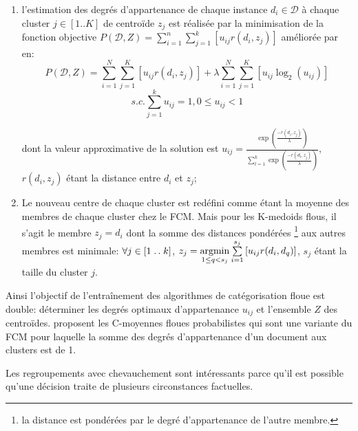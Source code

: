 \begin{enumerate}
 \item l'estimation des degrés d'appartenance de chaque instance $d_i \in \mathcal{D}$ à chaque cluster $j \in [1..K]$ de centroïde $z_j$ est réalisée par la minimisation de la fonction objective $P(\mathcal{D},Z) = \sum\limits_{i=1}^{n}\sum\limits_{j=1}^{k} \left[u_{ij}r(d_i,z_j)\right]$ \citep{krishnapuram2001fuzzycmedoids}  améliorée par \citet{sabzi2011fuzzykmedoids} en:
 \[P(\mathcal{D},Z) = \sum\limits_{i=1}^{N}\sum\limits_{j=1}^{K} \left[u_{ij}r(d_i,z_j)\right] + \lambda \sum\limits_{i=1}^{N}\sum\limits_{j=1}^{K} \left[ u_{ij}\log_2(u_{ij}) \right] \]
 \[s.c. \sum\limits_{j=1}^{k} u_{ij} = 1, 0 \leq u_{ij} < 1\]
 
 dont la valeur approximative de la solution est $u_{ij} = \frac{\exp\left(\frac{-r(d_i,z_j)}{\lambda}\right)}{\sum_{l=1}^{k}\exp\left(\frac{-r(d_l,z_j)}{\lambda}\right)},$ $r(d_i,z_j)$ étant la distance entre $d_i$ et  $z_j$;
 \item Le nouveau centre de chaque cluster est redéfini comme étant la moyenne des membres de chaque cluster chez le FCM. Mais pour les K-medoids flous, il s'agit le membre $z_j=d_i$ dont la somme des distances pondérées \footnote{la distance est pondérées par le degré d'appartenance de l'autre membre.} aux autres membres  est minimale: $\forall j \in  \left[1\mathrel{{.}\,{.}}\nobreak k \right]$, $z_j = \mathop{\mathrm{argmin}}\limits\limits_{1 \leq q < s_j} \sum\limits_{i=1}^{s_j} \left[u_{ij}r(d_i,d_q)\right]$, $s_j$ étant la taille du cluster $j$.
\end{enumerate}
 Ainsi l'objectif de l'entraînement des algorithmes de catégorisation floue est double: déterminer les degrés optimaux d'appartenance $u_{ij}$ et l'ensemble $Z$ des centroïdes. \citet{nefti2004probabilisticFuzzyCMeans} proposent les C-moyennes floues probabilistes qui sont une variante du FCM pour laquelle la somme des degrés d'appartenance  d'un document aux clusters est de 1.
 
 Les regroupements avec chevauchement sont intéressants parce qu'il est possible qu'une décision traite de plusieurs circonstances factuelles.

